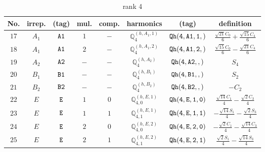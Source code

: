 \documentclass[fleqn,8pt]{jsarticle}
\begin{document}
\begin{table}[ht!]
\begin{center}
\caption{rank 4}
\renewcommand{\arraystretch}{1.3}
\begin{tabular}{cccccccc} \hline \hline
No. & irrep. & (tag) & mul. & comp. & harmonics & (tag) & definition \\ \hline
$ 17 $ & $ A_{1} $ & $ {\tt A1} $ & $ 1 $ & $ - $ & $ \mathbb{Q}_{4}^{(h,A_{1},1)} $ & $ {\tt Qh(4,A1,1,)} $ & $ \frac{\sqrt{21} C_{0}}{6} + \frac{\sqrt{15} C_{4}}{6} $ \\
$ 18 $ & $ A_{1} $ & $ {\tt A1} $ & $ 2 $ & $ - $ & $ \mathbb{Q}_{4}^{(h,A_{1},2)} $ & $ {\tt Qh(4,A1,2,)} $ & $ \frac{\sqrt{15} C_{0}}{6} - \frac{\sqrt{21} C_{4}}{6} $ \\
$ 19 $ & $ A_{2} $ & $ {\tt A2} $ & $ - $ & $ - $ & $ \mathbb{Q}_{4}^{(h,A_{2})} $ & $ {\tt Qh(4,A2,,)} $ & $ S_{4} $ \\
$ 20 $ & $ B_{1} $ & $ {\tt B1} $ & $ - $ & $ - $ & $ \mathbb{Q}_{4}^{(h,B_{1})} $ & $ {\tt Qh(4,B1,,)} $ & $ S_{2} $ \\
$ 21 $ & $ B_{2} $ & $ {\tt B2} $ & $ - $ & $ - $ & $ \mathbb{Q}_{4}^{(h,B_{2})} $ & $ {\tt Qh(4,B2,,)} $ & $ - C_{2} $ \\
$ 22 $ & $ E $ & $ {\tt E} $ & $ 1 $ & $ 0 $ & $ \mathbb{Q}_{4,0}^{(h,E,1)} $ & $ {\tt Qh(4,E,1,0)} $ & $ \frac{\sqrt{14} C_{1}}{4} - \frac{\sqrt{2} C_{3}}{4} $ \\
$ 23 $ & $ E $ & $ {\tt E} $ & $ 1 $ & $ 1 $ & $ \mathbb{Q}_{4,1}^{(h,E,1)} $ & $ {\tt Qh(4,E,1,1)} $ & $ - \frac{\sqrt{14} S_{1}}{4} - \frac{\sqrt{2} S_{3}}{4} $ \\
$ 24 $ & $ E $ & $ {\tt E} $ & $ 2 $ & $ 0 $ & $ \mathbb{Q}_{4,0}^{(h,E,2)} $ & $ {\tt Qh(4,E,2,0)} $ & $ - \frac{\sqrt{2} C_{1}}{4} - \frac{\sqrt{14} C_{3}}{4} $ \\
$ 25 $ & $ E $ & $ {\tt E} $ & $ 2 $ & $ 1 $ & $ \mathbb{Q}_{4,1}^{(h,E,2)} $ & $ {\tt Qh(4,E,2,1)} $ & $ \frac{\sqrt{2} S_{1}}{4} - \frac{\sqrt{14} S_{3}}{4} $ \\
 \hline \hline
\end{tabular}
\end{center}
\end{table}
\end{document}
